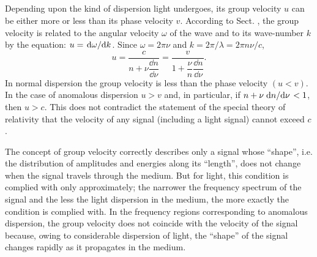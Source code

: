 \subsection{}\label{34.4.3} Depending upon the kind of dispersion light undergoes, its group velocity $u$ can be either more or less than its phase velocity $v$. According to Sect. , the group velocity is related to the angular velocity $\omega$ of the wave and to its wave-number $k$ by the equation: $u = \dv*{\omega}{k}$. Since $\omega = 2\pi \nu$ and $k = 2\pi/\lambda = 2\pi n \nu/c$,
\begin{equation*}%
u = \frac{c}{n + \nu \dfrac{\dd n}{\dd \nu}} =  \frac{v}{1 + \dfrac{\nu}{n} \dfrac{\dd n}{\dd \nu}}. 
\end{equation*}
In normal dispersion the group velocity is less than the phase
velocity $(u < v)$. In the case of anomalous dispersion $u > v$ and, in particular, if $n + \nu \dv*{n}{\nu} < 1$, then $u > c$. This does not contradict the statement of the special theory of relativity that the velocity of any signal (including a light signal) cannot exceed $c$ . 

The concept of group velocity correctly describes only a signal whose ``shape'', i.e. the distribution of amplitudes
and energies along its ``length'', does not change when the
signal travels through the medium. But for light, this condition is complied with only approximately; the narrower the frequency spectrum of the signal and the less the light dispersion in the medium, the more exactly the condition is complied with. In the frequency regions corresponding to anomalous dispersion, the group velocity does not coincide with the velocity of the signal because, owing to considerable dispersion of light, the ``shape'' of the signal changes rapidly as it propagates in the medium.


